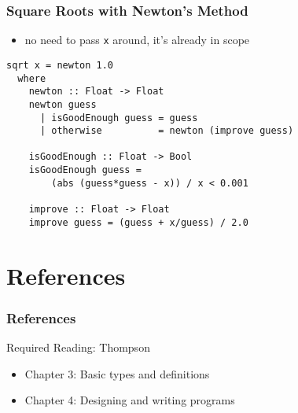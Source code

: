 \documentclass[dvipsnames]{beamer}
\theoremstyle{plain}
\begin{document}
\begin{frame}[fragile]
  \frametitle{Square Roots with Newton's Method}

  \begin{itemize}
    \item no need to pass \lstinline|x| around, it's already in scope
  \end{itemize}

  \begin{lstlisting}
sqrt x = newton 1.0
  where
    newton :: Float -> Float
    newton guess
      | isGoodEnough guess = guess
      | otherwise          = newton (improve guess)

    isGoodEnough :: Float -> Bool
    isGoodEnough guess =
        (abs (guess*guess - x)) / x < 0.001

    improve :: Float -> Float
    improve guess = (guess + x/guess) / 2.0
  \end{lstlisting}
\end{frame}

\section*{References}

\begin{frame}
  \frametitle{References}

  \begin{block}{Required Reading: Thompson}
    \begin{itemize}
      \item Chapter 3: \alert{Basic types and definitions}
      \item Chapter 4: \alert{Designing and writing programs}
    \end{itemize}
  \end{block}
\end{frame}
\end{document}
